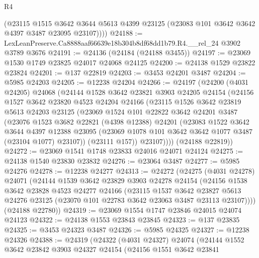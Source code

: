 \begin{lexlean}{R4}
\begin{coremodule}
        (@23115
          @1515
          @3642
          @3644
          @5613
          @4399
          @23125
          (@23083 @101 @3642 @3642 @4397 @3487 @23095 @23107))))
@24188 := LexLeanPreserve.Ca8888aaf66639e18b304b8df68dd1b79.R4.__rel_24 @3902 @3789 @3676
@24191 := @24136 (@24184 (@24188 @3455))
@24197 := @23069 @1530 @1749 @23825 @24017 @24068 @24125
@24200 := @24138 @1529 @23822 @23824
@24201 := @137 @22819
@24203 := @3453 @24201 @3487
@24204 := @5985 @24203
@24205 := @12238 @24204
@24266 := @24197
    (@24200
      (@4031 @24205)
      @24068
      (@24144
        @1528
        @3642
        @23821
        @3903
        @24205
        @24154
        (@24156
          @1527
          @3642
          @23820
          @4523
          @24204
          @24166
          (@23115
            @1526
            @3642
            @23819
            @5613
            @24203
            @23125
            (@23069
              @1524
              @101
              @22822
              @3642
              @24201
              @3487
              (@23076
                @1523
                @3682
                @22821
                (@4398 @12388)
                @24201
                (@23083
                  @1522
                  @3642
                  @3644
                  @4397
                  @12388
                  @23095
                  (@23069 @1078 @101 @3642 @3642 @1077 @3487 (@23104 @1077) @23107))
                (@23111 @157))
              @23107))))
      (@24188 @22819))
@24272 := @23069 @1541 @1748 @23833 @24016 @24071 @24124
@24275 := @24138 @1540 @23830 @23832
@24276 := @23064 @3487
@24277 := @5985 @24276
@24278 := @12238 @24277
@24313 := @24272
    (@24275
      (@4031 @24278)
      @24071
      (@24144
        @1539
        @3642
        @23829
        @3903
        @24278
        @24154
        (@24156
          @1538
          @3642
          @23828
          @4523
          @24277
          @24166
          (@23115
            @1537
            @3642
            @23827
            @5613
            @24276
            @23125
            (@23070 @101 @22783 @3642 @23063 @3487 @23113 @23107))))
      (@24188 @22780))
@24319 := @23069 @1554 @1747 @23846 @24015 @24074 @24123
@24322 := @24138 @1553 @23843 @23845
@24323 := @137 @23835
@24325 := @3453 @24323 @3487
@24326 := @5985 @24325
@24327 := @12238 @24326
@24388 := @24319
    (@24322
      (@4031 @24327)
      @24074
      (@24144
        @1552
        @3642
        @23842
        @3903
        @24327
        @24154
        (@24156
          @1551
          @3642
          @23841

\end{coremodule}
\end{lexlean}
